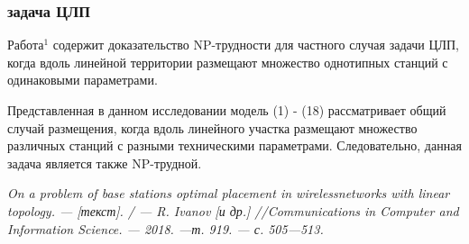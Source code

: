 \begin{frame}
    \frametitle{задача ЦЛП}
    \justifying
    
    Работа$^1$ содержит доказательство NP-трудности для частного случая задачи ЦЛП, когда вдоль линейной территории размещают множество однотипных станций с одинаковыми параметрами. 
    \bigskip
    
    Представленная в данном исследовании модель (1) - (18) рассматривает общий случай размещения, когда вдоль линейного участка размещают множество различных станций с разными техническими параметрами. Следовательно, данная задача является также NP-трудной.
    \bigskip

    
    \bigskip

    \bigskip
    \bigskip
    \begin{minipage}[b]{0.99\linewidth}
        \fontsize{6pt}{7.2}\selectfont
    \textit{ On a problem of base stations optimal placement in wirelessnetworks with linear topology. — [текст]. / — R. Ivanov [и др.] //Communications in Computer and Information Science. — 2018. —т. 919. — с. 505—513.}
    \end{minipage}

\end{frame}

